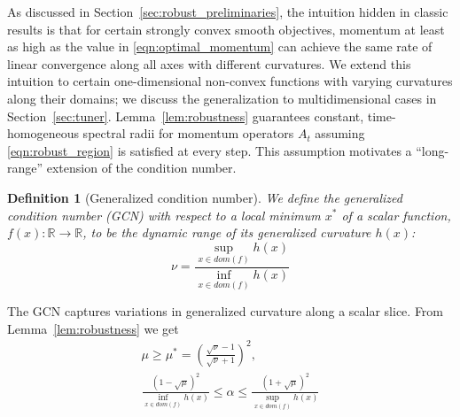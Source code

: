 \documentclass{article}
\newtheorem{definition}[theorem]{Definition}
\newcommand{\mat}[1]{\bm{\mathit{#1}}}
\begin{document}
As discussed in Section~\ref{sec:robust_preliminaries}, the intuition hidden in classic results
is that for certain strongly convex smooth objectives, 
momentum at least as high as
the value in \eqref{eqn:optimal_momentum} can achieve the same rate of linear convergence along all axes with different curvatures. 
We extend this intuition to certain one-dimensional non-convex functions with varying curvatures along their domains; we discuss the generalization to multidimensional cases in Section~\ref{sec:tuner}.
Lemma~\ref{lem:robustness} guarantees constant, time-homogeneous spectral radii for momentum operators $\mat{A}_t$ 
assuming \eqref{eqn:robust_region} is satisfied at every step. 
This assumption motivates a ``long-range'' extension of the condition number.
\begin{definition}[Generalized condition number]
We define the generalized condition number (GCN) with respect to a local minimum $x^*$ of a scalar function, $f(x):\mathbb{R}\rightarrow \mathbb{R}$, to be the dynamic range of its generalized curvature $h(x)$:
\begin{equation}
	\nu = \frac{\sup_{x \in dom(f)} h(x)}{ \inf_{x \in dom(f)} h(x)}
\end{equation}
\end{definition}
The GCN captures variations in generalized curvature along a scalar slice.
From Lemma~\ref{lem:robustness} we get
\begin{equation}
\begin{gathered}
	\mu \geq \mu^* = \left(\frac{\sqrt{\nu}-1}{\sqrt{\nu}+1}\right)^2, \\
	\frac{(1-\sqrt{\mu})^2}{\inf_{x \in dom(f)}h(x)} \leq \alpha \leq \frac{(1+\sqrt{\mu})^2}{\sup_{x \in dom(f)}h(x)}
	\label{eqn:noiseless_tuning_rule}
\end{gathered}
\end{equation}
\end{document}
